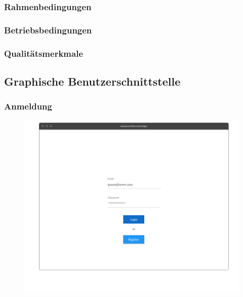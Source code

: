 		\subsubsection{Rahmenbedingungen}
		
		\subsubsection{Betriebsbedingungen}
		
		\subsubsection{Qualitätsmerkmale}
		
	\subsection{Graphische Benutzerschnittstelle}
		
		\subsubsection{Anmeldung}
			\begin{figure}[H]
				\includegraphics[scale=0.4]{images/p1}
			\end{figure}
		
